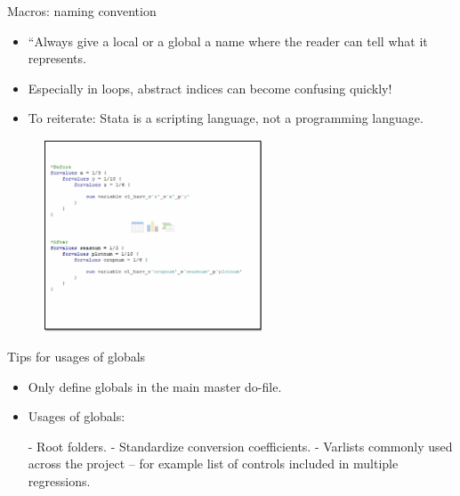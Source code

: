 \documentclass[aspectratio=169]{beamer}
\begin{document}
\begin{frame}[fragile]{Macros: naming convention}
\begin{multicols}{2}	
	
	\begin{itemize}[<default overlay specification>]
		\item<1> “Always give a local or a global a name where the reader can tell what it represents.
		\item<1>  Especially in loops, abstract indices can become confusing quickly!
		\item<1>  To reiterate: Stata is a scripting language, not a programming language.
	\end{itemize}
	
	\begin{figure}
		\centering
		\includegraphics[width=65mm, right]{img/Syntax2}
	\end{figure}
	
\end{multicols}
\end{frame}

\begin{frame}{Tips for usages of globals}
	
	\begin{itemize}[<default overlay specification>]
		\item<1>  Only define globals in the main master do-file.
		\item<1>  Usages of globals:

			\leavevmode 	\newline  - Root folders.
			\leavevmode 	\newline  - Standardize conversion coefficients.
			\leavevmode 	\newline  - Varlists commonly used across the project – for example list of controls included in multiple regressions.
	\end{itemize}
	
\end{frame}
\end{document}
